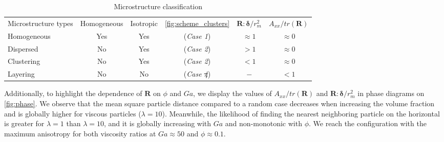 \documentclass[11pt]{My_preprint}
\providecommand{\DIFadd}[1]{{\protect\color{blue}\uwave{#1}}} %
\providecommand{\DIFdel}[1]{{\protect\color{red}\sout{#1}}}                      %
\providecommand{\DIFaddFL}[1]{\DIFadd{#1}} %
\providecommand{\DIFdelFL}[1]{\DIFdel{#1}} %
\providecommand{\DIFaddbeginFL}{} %
\providecommand{\DIFaddendFL}{} %
\providecommand{\DIFdelbeginFL}{} %
\providecommand{\DIFdelendFL}{} %
\begin{document}
\begin{table}[h!]
    \caption{Microstructure classification}
    \label{tab:microstructure}
    \centering
    \begin{tabular}{|lccccc|} \hline
        Microstructure types & Homogeneous & Isotropic & \ref{fig:scheme_clusters} & $\textbf{R}:\bm\delta/r_m^2$ & $A_{xx}/tr(\textbf{R})$ \\
        Homogeneous & Yes & Yes &(\textit{Case 1}) & $ \approx 1$ & $\approx 0$ \\
        Dispersed &  No & Yes  &(\textit{Case 2}) & $ > 1$ & $\approx 0$ \\
        Clustering &  No & Yes  &(\textit{Case 2}) & $ < 1$ & $\approx 0$ \\
        Layering &    No & No  &(\textit{Case \DIFdelbeginFL \DIFdelFL{4}\DIFdelendFL \DIFaddbeginFL \DIFaddFL{3}\DIFaddendFL }) & $ - $ & $< 1$\\ \hline
    \end{tabular}
\end{table}
Additionally, to highlight the dependence of $\textbf{R}$ on $\phi$ and $Ga$, we display the values of $A_{xx}/tr(\textbf{R})$ and $\textbf{R}:\bm\delta/r_m^2$ in phase diagrams on \ref{fig:phase}.
We observe that the mean square particle distance compared to a random case decreases when increasing the volume fraction and is globally higher for viscous particles ($\lambda = 10$).
Meanwhile, the likelihood of finding the nearest neighboring particle on the horizontal is greater for $\lambda=1$ than $\lambda = 10$, and it is globally increasing with  $Ga$ and non-monotonic with $\phi$. 
We reach the configuration with the maximum anisotropy for both viscosity ratios at $Ga \approx 50$ and $\phi \approx 0.1$. 
\end{document}
